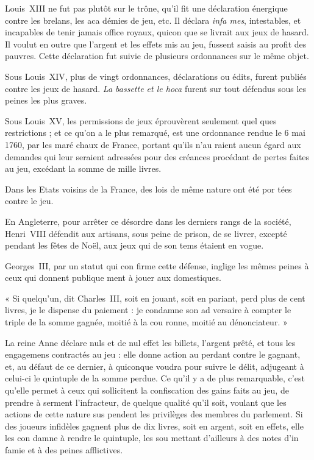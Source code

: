 Louis~XIII ne fut pas plutôt sur
le trône, qu'il fit une déclaration
énergique contre les brelans, les aca%
démies de jeu, etc. Il déclara \emph{infa%
mes}, intestables, et incapables de
tenir jamais office royaux, quicon%
que se livrait aux jeux de hasard.
Il voulut en outre que l'argent et les
effets mis au jeu, fussent saisis au
profit des pauvres. Cette déclaration
fut suivie de plusieurs ordonnances
sur le même objet.

Sous Louis~XIV, plus de vingt
ordonnances, déclarations ou édits,
furent publiés contre les jeux de
hasard. \emph{La bassette et le hoca} furent
sur tout défendus sous les peines les 
plus graves.

Sous Louis~XV, les permissions
de jeux éprouvèrent seulement quel%
ques restrictions ; et ce qu'on a le
plus remarqué, est une ordonnance
rendue le 6 mai 1760, par les maré%
chaux de France, portant qu'ils n'au%
raient aucun égard aux demandes 
qui leur seraient adressées pour des
créances procédant de pertes faites
au jeu, excédant la somme de mille
livres.

Dans les Etats voisins de la France,
des lois de même nature ont été por%
tées contre le jeu.

En Angleterre, pour arrêter ce
désordre dans les derniers rangs de
la société, Henri~VIII défendit aux
artisans, sous peine de prison, de se
livrer, excepté pendant les fêtes de
Noël, aux jeux qui de son tems étaient
en vogue.

Georges~III, par un statut qui con%
firme cette défense, inglige les mêmes
peines à ceux qui donnent publique%
ment à jouer aux domestiques.

« Si quelqu'un, dit Charles~III, soit
en jouant, soit en pariant, perd
plus de cent livres, je le dispense
du paiement : je condamne son ad%
versaire à compter le triple de la
somme gagnée, moitié à la cou%
ronne, moitié au dénonciateur. »

La reine Anne déclare nuls et de
nul effet les billets, l'argent prêté,
et tous les engagemens contractés au
jeu : elle donne action au perdant
contre le gagnant, et, au défaut de
ce dernier, à quiconque voudra pour%
suivre le délit, adjugeant à celui-ci
le quintuple de la somme perdue. Ce
qu'il y a de plus remarquable, c'est
qu'elle permet à ceux qui sollicitent
la confiscation des gains faits au jeu,
de prendre à serment l'infracteur,
de quelque qualité qu'il soit, voulant
que les actions de cette nature sus%
pendent les privilèges des membres
du parlement. Si des joueurs infidèles
gagnent plus de dix livres, soit en
argent, soit en effets, elle les con%
damne à rendre le quintuple, les sou%
mettant d'ailleurs à des notes d'in%
famie et à des peines afflictives.

